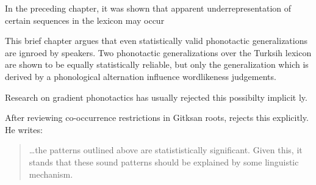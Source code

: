 
In the preceding chapter, it was shown that apparent underrepresentation of certain sequences in the lexicon may occur 

This brief chapter argues that even statistically valid phonotactic generalizations are ignroed by speakers. Two phonotactic generalizations over the Turksih lexicon are shown to be equally statistically reliable, but only the generalization which is derived by a phonological alternation influence wordlikeness judgements. 

Research on gradient phonotactics has usually rejected this possibilty implicit
ly.

After reviewing co-occurrence restrictions in Gitksan roots, \citet{Brown2010} rejects this explicitly. He writes: 

\begin{quotation}
\ldots the patterns outlined above are statististically significant. Given this, it stands that these sound patterns should be explained by some linguistic mechanism. \citep[][48]{Brown2010}
\end{quotation}


